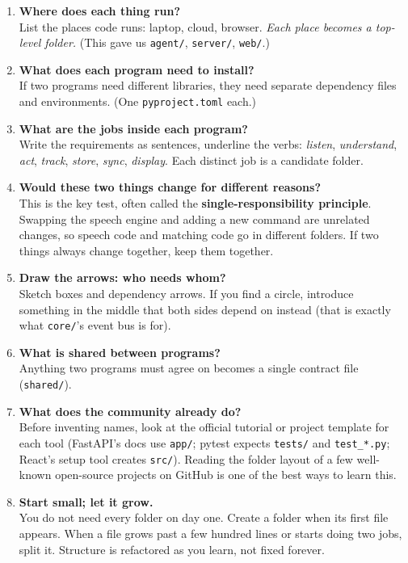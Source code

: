 \documentclass[11pt,a4paper]{article}
\begin{document}
\begin{enumerate}
  \item \textbf{Where does each thing run?}\\
        List the places code runs: laptop, cloud, browser. \emph{Each place becomes a top-level
        folder.} (This gave us \texttt{agent/}, \texttt{server/}, \texttt{web/}.)

  \item \textbf{What does each program need to install?}\\
        If two programs need different libraries, they need separate dependency files and
        environments. (One \texttt{pyproject.toml} each.)

  \item \textbf{What are the jobs inside each program?}\\
        Write the requirements as sentences, underline the verbs: \emph{listen},
        \emph{understand}, \emph{act}, \emph{track}, \emph{store}, \emph{sync},
        \emph{display}. Each distinct job is a candidate folder.

  \item \textbf{Would these two things change for different reasons?}\\
        This is the key test, often called the \textbf{single-responsibility principle}.
        Swapping the speech engine and adding a new command are unrelated changes, so speech
        code and matching code go in different folders. If two things always change together,
        keep them together.

  \item \textbf{Draw the arrows: who needs whom?}\\
        Sketch boxes and dependency arrows. If you find a circle, introduce something in the
        middle that both sides depend on instead (that is exactly what \texttt{core/}'s event
        bus is for).

  \item \textbf{What is shared between programs?}\\
        Anything two programs must agree on becomes a single contract file (\texttt{shared/}).

  \item \textbf{What does the community already do?}\\
        Before inventing names, look at the official tutorial or project template for each
        tool (FastAPI's docs use \texttt{app/}; pytest expects \texttt{tests/} and
        \texttt{test\_*.py}; React's setup tool creates \texttt{src/}). Reading the folder
        layout of a few well-known open-source projects on GitHub is one of the best ways to
        learn this.

  \item \textbf{Start small; let it grow.}\\
        You do not need every folder on day one. Create a folder when its first file appears.
        When a file grows past a few hundred lines or starts doing two jobs, split it.
        Structure is refactored as you learn, not fixed forever.
\end{enumerate}
\end{document}
